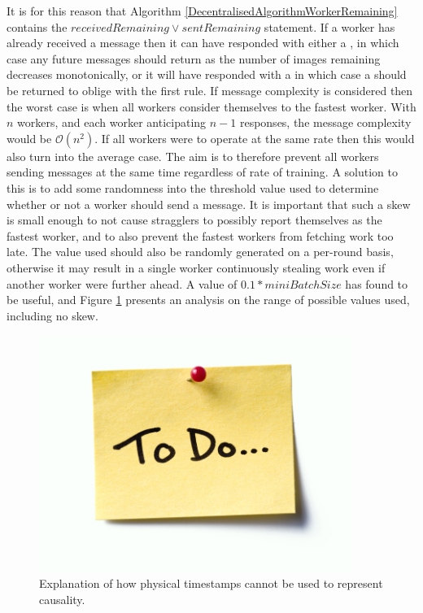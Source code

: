 \documentclass[12pt]{article}
\begin{document}
It is for this reason that Algorithm \ref{DecentralisedAlgorithmWorkerRemaining} contains the $receivedRemaining \lor sentRemaining$ statement. If a worker has already received a  message then it can have responded with either a , in which case any future messages should return  as the number of images remaining decreases monotonically, or it will have responded with a  in which case a  should be returned to oblige with the first rule.
\newline
\newline
If message complexity is considered then the worst case is when all workers consider themselves to the fastest worker. With $n$ workers, and each worker anticipating $n-1$ responses, the message complexity would be $\mathcal{O}(n^2)$. If all workers were to operate at the same rate then this would also turn into the average case.
\newline
\newline
The aim is to therefore prevent all workers sending  messages at the same time regardless of rate of training. A solution to this is to add some randomness into the threshold value used to determine whether or not a worker should send a  message. It is important that such a skew is small enough to not cause stragglers to possibly report themselves as the fastest worker, and to also prevent the fastest workers from fetching work too late. The value used should also be randomly generated on a per-round basis, otherwise it may result in a single worker continuously stealing work even if another worker were further ahead.
\newline
\newline
A value of $0.1*miniBatchSize$ has found to be useful, and Figure \ref{skewValue} presents an analysis on the range of possible values used, including no skew.

\begin{figure}[H]
  \centering
  \includegraphics[width=4in]{todo}
  \caption[]{Explanation of how physical timestamps cannot be used to represent causality.}
  \label{skewValue}
\end{figure}
\end{document}
